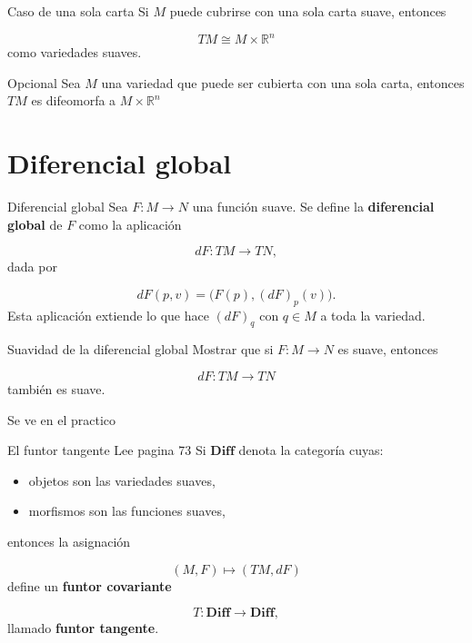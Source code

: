 \begin{bookexercise}{Caso de una sola carta}
Si $M$ puede cubrirse con una sola carta suave, entonces

\[
TM\cong M\times\mathbb R^n
\]
como variedades suaves.

\end{bookexercise}
\begin{bookexample}{Opcional}
Sea $M$ una variedad que puede ser cubierta con una sola carta, entonces $TM$ es difeomorfa a $M\times \mathbb{R}^{n}$

\end{bookexample}
\section{Diferencial global}
\begin{bookdefinition}{Diferencial global}
Sea $F:M\to N$ una función suave. Se define la \textbf{diferencial global} de $F$ como la aplicación

\[
dF:TM\to TN,
\]
dada por

\[
dF(p,v)=\bigl(F(p),(dF)_p(v)\bigr).
\]
Esta aplicación extiende lo que hace $(dF)_{q}$ con $q\in M$ a toda la variedad.

\end{bookdefinition}
\label{blk:fce8ee}
\begin{bookremark}{Suavidad de la diferencial global}
Mostrar que si $F:M\to N$ es suave, entonces

\[
dF:TM\to TN
\]
también es suave.

\end{bookremark}
\begin{bookproof}{}
Se ve en el practico

\bookqed
\end{bookproof}
\label{blk:a36c7a}
\begin{bookremark}{El funtor tangente Lee pagina 73}
Si $\mathbf{Diff}$ denota la categoría cuyas:

\begin{itemize}
\item objetos son las variedades suaves,
\item morfismos son las funciones suaves,
\end{itemize}
entonces la asignación

\[
(M,F)\longmapsto (TM,dF)
\]
define un \textbf{funtor covariante}

\[
T:\mathbf{Diff}\to\mathbf{Diff},
\]
llamado \textbf{funtor tangente}.

\end{bookremark}

